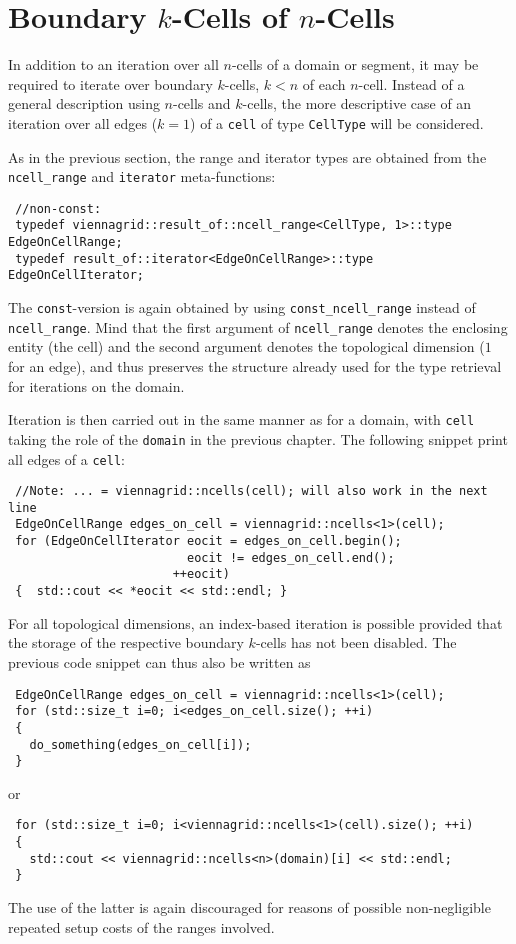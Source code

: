 \section{Boundary $k$-Cells of $n$-Cells}
In addition to an iteration over all $n$-cells of a domain or segment, it may be required to iterate over boundary $k$-cells, $k<n$ of each $n$-cell.
Instead of a general description using $n$-cells and $k$-cells, the more descriptive case of an iteration over all edges ($k=1$) of a \lstinline|cell| of type \lstinline|CellType| will be considered.


As in the previous section, the range and iterator types are obtained from the \lstinline|ncell_range| and \lstinline|iterator| meta-functions:
\begin{lstlisting}
 //non-const:
 typedef viennagrid::result_of::ncell_range<CellType, 1>::type    EdgeOnCellRange;
 typedef result_of::iterator<EdgeOnCellRange>::type    EdgeOnCellIterator;
\end{lstlisting}
The \lstinline|const|-version is again obtained by using \lstinline|const_ncell_range| instead of \lstinline|ncell_range|.
Mind that the first argument of \lstinline|ncell_range| denotes the enclosing entity (the cell) and the second argument denotes the topological dimension ($1$ for an edge), and thus preserves the structure already used for the type retrieval for iterations on the domain.

Iteration is then carried out in the same manner as for a domain, with \lstinline|cell| taking the role of the \lstinline|domain| in the previous chapter.
The following snippet print all edges of a \lstinline|cell|:
\begin{lstlisting}
 //Note: ... = viennagrid::ncells(cell); will also work in the next line
 EdgeOnCellRange edges_on_cell = viennagrid::ncells<1>(cell);
 for (EdgeOnCellIterator eocit = edges_on_cell.begin();
                         eocit != edges_on_cell.end();
                       ++eocit)
 {  std::cout << *eocit << std::endl; } 
\end{lstlisting}

For all topological dimensions, an index-based iteration is possible provided that the storage of the respective boundary $k$-cells has not been disabled. The previous code snippet can thus also be written as
\begin{lstlisting}
 EdgeOnCellRange edges_on_cell = viennagrid::ncells<1>(cell);
 for (std::size_t i=0; i<edges_on_cell.size(); ++i)
 { 
   do_something(edges_on_cell[i]);
 }
\end{lstlisting}
or
\begin{lstlisting}
 for (std::size_t i=0; i<viennagrid::ncells<1>(cell).size(); ++i)
 {
   std::cout << viennagrid::ncells<n>(domain)[i] << std::endl;
 }
\end{lstlisting}
The use of the latter is again discouraged for reasons of possible non-negligible repeated setup costs of the ranges involved.

